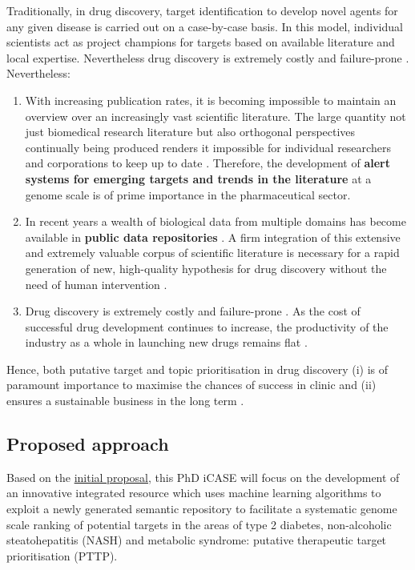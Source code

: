 Traditionally, in drug discovery, target identification to develop novel agents for any given disease is carried out on a case-by-case basis. In this model, individual scientists act as project champions for targets based on available literature and local expertise. Nevertheless   drug discovery is extremely costly and failure-prone \cite{ferrero2017}. Nevertheless:

\begin{enumerate}
    
    \item With increasing publication rates, it is becoming impossible to maintain an overview over an increasingly vast scientific literature. The large quantity not just biomedical research literature but also orthogonal perspectives continually being produced renders it impossible for individual researchers and corporations to keep up to date \cite{brown2018}. Therefore, the development of \textbf{alert systems for emerging targets and trends in the literature} at a genome scale is of prime importance in the pharmaceutical sector.
    
    \item In recent years a wealth of biological data from multiple domains has become available in \textbf{public data repositories} \cite{brown2018}. A firm integration of this extensive and extremely valuable corpus of scientific literature is necessary for a rapid generation of new, high-quality hypothesis for drug discovery without the need of human intervention \cite{ferrero2017, brown2018}.
    
    \item Drug discovery is extremely costly and failure-prone \cite{ferrero2017}. As the cost of successful drug development continues to increase, the productivity of the industry as a whole in launching new drugs remains flat \cite{brown2018}.

\end{enumerate}

\noindent
Hence, both putative target and topic prioritisation in drug discovery (i) is of paramount importance to maximise the chances of success in clinic \cite{ferrero2017} and (ii) ensures a sustainable business in the long term \cite{ferrero2017}.

\subsection{Proposed approach}
Based on the \href{https://goo.gl/QrfdfY}{initial proposal}, this PhD iCASE will focus on the development of an innovative integrated resource which uses machine learning algorithms to exploit a newly generated semantic repository to facilitate a systematic genome scale ranking of potential targets in the areas of type 2 diabetes, non-alcoholic steatohepatitis (NASH) and metabolic syndrome: putative therapeutic target prioritisation (PTTP).

